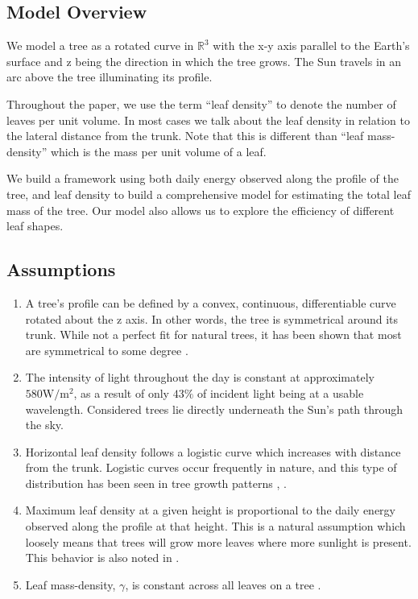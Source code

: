 \documentclass[10pt]{article}
\numberwithin{equation}{subsection}
\begin{document}
\subsection{Model Overview}
We model a tree as a rotated curve in $\mathbb{R}^3$ with the x-y axis
parallel to the Earth's surface and z being the direction in which the
tree grows. The Sun travels in an arc above the tree illuminating its
profile.

Throughout the paper, we use the term ``leaf density'' to denote the
number of leaves per unit volume. In most cases we talk about the leaf
density in relation to the lateral distance from the trunk. Note that
this is different than ``leaf mass-density'' which is the mass per
unit volume of a leaf.

We build a framework using both daily energy observed along the
profile of the tree, and leaf density to build a comprehensive model
for estimating the total leaf mass of the tree. Our model also allows
us to explore the efficiency of different leaf shapes.

\subsection{Assumptions}
\begin{enumerate}[$\bullet$]
    \item A tree's profile can be defined by a convex, continuous,
      differentiable curve rotated about the z axis. In other words,
      the tree is symmetrical around its trunk. While not a perfect
      fit for natural trees, it has been shown that most are
      symmetrical to some degree \citep{treeSymm01}.

    \item The intensity of light throughout the day is constant at
      approximately $580 \mathrm{W}/\mathrm{m}^2$, as a result of only
      $43\%$ of incident light being at a usable
      wavelength\citep{plantAbsrb01}. Considered trees lie directly
      underneath the Sun's path through the sky.

    \item Horizontal leaf density follows a logistic curve which
      increases with distance from the trunk.  Logistic curves occur
      frequently in nature, and this type of distribution has been
      seen in tree growth patterns \citep{sigmoid01},
      \citep{sigmoid02}.

    \item Maximum leaf density at a given height is proportional
      to the daily energy observed along the profile at that height.
      This is a natural assumption which loosely means that trees will
      grow more leaves where more sunlight is present. This behavior
      is also noted in \citep{sunLeaf01}.

    \item Leaf mass-density, $\gamma$, is constant across all leaves
      on a tree \citep{massdensity01}.
\end{enumerate}
\end{document}

